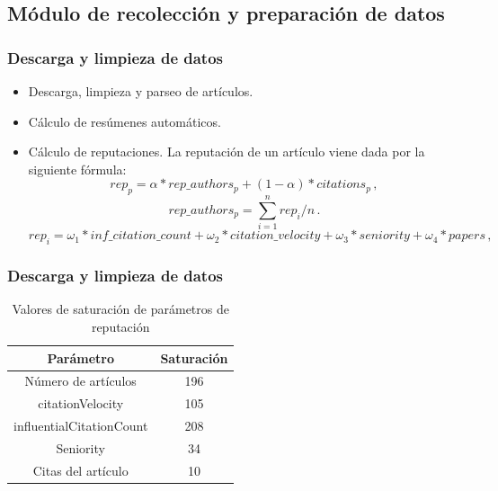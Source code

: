 \documentclass[10pt,fleqn]{beamer}
\begin{document}
\subsection{Módulo de recolección y preparación de datos}
\begin{frame} \frametitle{Descarga y limpieza de datos} 
\begin{itemize}
\item Descarga, limpieza y parseo de artículos.
\item Cálculo de resúmenes automáticos.
\item Cálculo de reputaciones.
La reputación de un artículo viene dada por la siguiente fórmula:
\begin{equation}
	rep_{p} = \alpha * 	rep\_authors_{p}  + (1 - \alpha) * citations_{p} \,,
\end{equation}
\begin{equation}\label{eq:1}
	rep\_authors_{p} = \sum  \limits_{i=1}^n  rep_{i} / n \,.
\end{equation}
\begin{equation}
	rep_{i} = \omega_1 * inf\_citation\_count + \omega_2 * citation\_velocity + \omega_3 * seniority + \omega_4 * papers \,,
    \label{eq:author_reputation}
\end{equation}


\end{itemize}

\end{frame}

\begin{frame} \frametitle{Descarga y limpieza de datos} 
\begin{table}[]
\begin{center}

\begin{tabular}{|c|c|}
\hline
\textbf{Parámetro}       & \textbf{Saturación} \\ \hline
Número de artículos      & 196                 \\ \hline
citationVelocity         & 105                 \\ \hline
influentialCitationCount & 208                 \\ \hline
Seniority                & 34                  \\ \hline
Citas del artículo       & 10                  \\ \hline
\end{tabular}
\caption{Valores de saturación de parámetros de reputación}
\label{tab:saturacion}
\end{center}
\end{table}

\end{frame}
\end{document}
